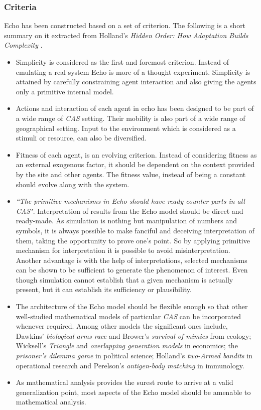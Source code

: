 \subsubsection{Criteria}
Echo has been constructed based on a set of criterion. The following is a short summary on it extracted from Holland's \textsl{Hidden Order: How Adaptation Builds Complexity} \cite{holland1996}.

\begin{itemize}
	\item Simplicity is considered as the first and foremost criterion. Instead of emulating a real system Echo is more of a thought experiment. Simplicity is attained by carefully constraining agent interaction and also giving the agents only a primitive internal model. 
	\item Actions and interaction of each agent in echo has been designed to be part of a wide range of \textsl{CAS} setting. Their mobility is also part of a wide range of geographical setting. Input to the environment which is considered as a stimuli or resource, can also be diversified.
	\item Fitness of each agent, is an evolving criterion. Instead of considering fitness as an external exogenous factor, it should be dependent on the context provided by the site and other agents. The fitness value, instead of being a constant should evolve along with the system. 
	\item \textsl{``The primitive mechanisms in Echo should have ready counter parts in all \textsl{CAS}"}. Interpretation of results from the Echo model should be direct and ready-made. As simulation is nothing but manipulation of numbers and symbols, it is always possible to make fanciful and deceiving interpretation of them, taking the opportunity to prove one's point. So by applying primitive mechanism for interpretation it is possible to avoid misinterpretation. Another advantage is with the help of interpretations, selected mechanisms can be shown to be sufficient to generate the phenomenon of interest. Even though simulation cannot establish that a given mechanism is actually present, but it can establish its sufficiency or plausibility.
	\item The architecture of the Echo model should be flexible enough so that other well-studied mathematical models of particular \textsl{CAS} can be incorporated whenever required. Among other models the significant ones include, Dawkins' \textsl{biological arms race} \cite{dawkins1990} and Brower's \textsl{survival of mimics} \cite{brower1988} from ecology; Wicksell's \textsl{Triangle} \cite{marimon1989} and \textsl{overlapping generation models} \cite{anderson1989} in economics; the \textsl{prisoner's dilemma game} \cite{axelrod1984} in political science; Holland's \textsl{two-Armed bandits} \cite{holland1975} in operational research and Perelson's \textsl{antigen-body matching} \cite{perelson1999} in immunology. 
	\item As mathematical analysis provides the surest route to arrive at a valid generalization point, most aspects of the Echo model should be amenable to mathematical analysis. 
\end{itemize}

